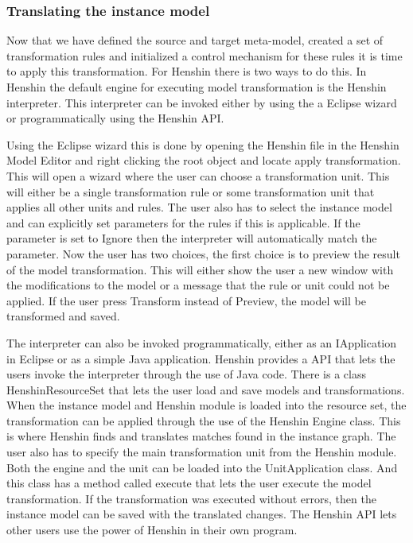 \subsubsection*{Translating the instance model}

Now that we have defined the source and target meta-model, created a set of
transformation rules and initialized a control mechanism for these rules it is
time to apply this transformation. For Henshin there is two ways to do this. In
Henshin the default engine for executing model transformation is the Henshin
interpreter. This interpreter can be invoked either by using the a Eclipse wizard
or programmatically using the Henshin API. 

Using the Eclipse wizard this is done by opening the Henshin file in the Henshin
Model Editor and right clicking the root object and locate apply transformation.
This will open a wizard where the user can choose a transformation unit. This
will either be a single transformation rule or some transformation unit that
applies all other units and rules. The user also has to select the instance
model and can explicitly set parameters for the rules if this is applicable. If
the parameter is set to Ignore then the interpreter will automatically match the
parameter. Now the user has two choices, the first choice is to preview the
result of the model transformation. This will either show the user a new window
with the modifications to the model or a message that the rule or unit could not
be applied. If the user press Transform instead of Preview, the model will be
transformed and saved.

The interpreter can also be invoked programmatically, either as an IApplication
in Eclipse or as a simple Java application. Henshin provides a API that lets the
users invoke the interpreter through the use of Java code. There is a class
HenshinResourceSet that lets the user load and save models and transformations.
When the instance model and Henshin module is loaded into the resource set, the
transformation can be applied through the use of the Henshin Engine class. This
is where Henshin finds and translates matches found in the instance graph. The
user also has to specify the main transformation unit from the Henshin module.
Both the engine and the unit can be loaded into the UnitApplication class. And
this class has a method called execute that lets the user execute the model
transformation. If the transformation was executed without errors, then the
instance model can be saved with the translated changes. The Henshin API lets
other users use the power of Henshin in their own program.


